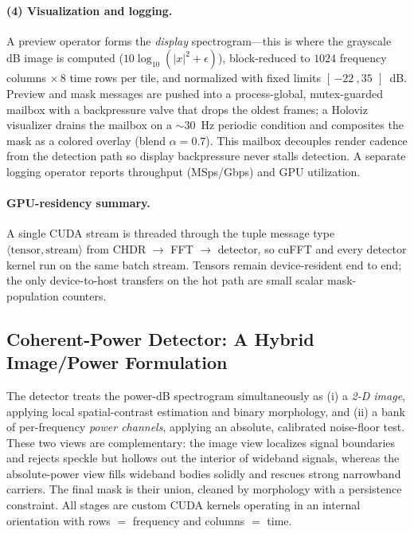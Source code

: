\paragraph{(4) Visualization and logging.}
A preview operator forms the \emph{display} spectrogram---this is where the
grayscale dB image is computed ($10\log_{10}(\lvert x\rvert^2+\epsilon)$),
block-reduced to $1024$ frequency columns $\times\,8$ time rows per tile, and
normalized with fixed limits $[\,\SI{-22}{},\SI{+35}{}\,]$~dB. Preview and mask
messages are pushed into a process-global, mutex-guarded mailbox with a
backpressure valve that drops the oldest frames; a Holoviz visualizer drains the
mailbox on a $\sim$\SI{30}{\hertz} periodic condition and composites the mask as
a colored overlay (blend $\alpha\!=\!0.7$). This mailbox decouples render cadence
from the detection path so display backpressure never stalls detection. A
separate logging operator reports throughput (MSps/Gbps) and GPU utilization.

\paragraph{GPU-residency summary.}
A single CUDA stream is threaded through the tuple message type
$\langle \text{tensor}, \text{stream}\rangle$ from CHDR $\to$ FFT $\to$ detector,
so cuFFT and every detector kernel run on the same batch stream. Tensors remain
device-resident end to end; the only device-to-host transfers on the hot path are
small scalar mask-population counters.

\subsection{Coherent-Power Detector: A Hybrid Image/Power Formulation}
\label{sec:detector}

The detector treats the power-dB spectrogram simultaneously as (i) a
\emph{2-D image}, applying local spatial-contrast estimation and binary
morphology, and (ii) a bank of per-frequency \emph{power channels}, applying an
absolute, calibrated noise-floor test. These two views are complementary: the
image view localizes signal boundaries and rejects speckle but hollows out the
interior of wideband signals, whereas the absolute-power view fills wideband
bodies solidly and rescues strong narrowband carriers. The final mask is their
union, cleaned by morphology with a persistence constraint. All stages are custom
CUDA kernels operating in an internal orientation with rows $=$ frequency and
columns $=$ time.


